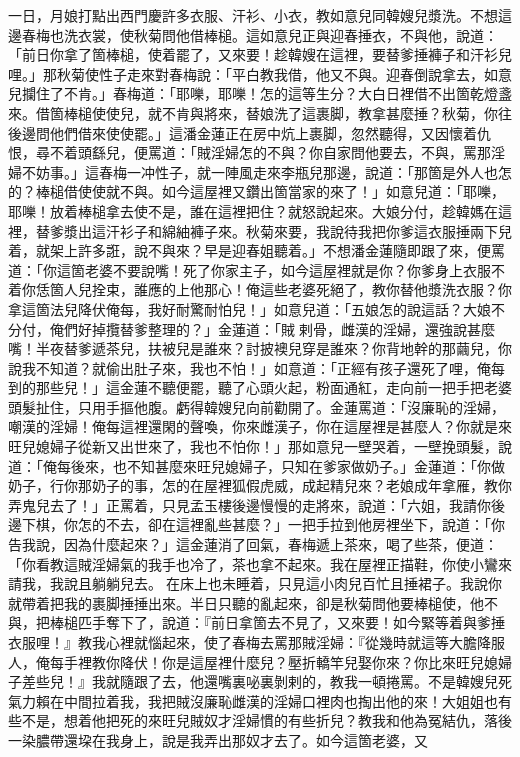一日，月娘打點出西門慶許多衣服、汗衫、小衣，教如意兒同韓嫂兒漿洗。不想這邊春梅也洗衣裳，使秋菊問他借棒槌。這如意兒正與迎春捶衣，不與他，說道：「前日你拿了箇棒槌，使着罷了，又來要！{}趁韓嫂在這裡，要替爹捶褲子和汗衫兒哩。」那秋菊使性子走來對春梅說：「平白教我借，他又不與。迎春倒說拿去，如意兒攔住了不肯。」春梅道：「耶嚛，耶嚛！怎的這等生分？大白日裡借不出箇乾燈盞來。借箇棒槌使使兒，就不肯與將來，替娘洗了這裹脚，教拿甚麼捶？秋菊，你往後邊問他們借來使使罷。」這潘金蓮正在房中炕上裹脚，忽然聽得，又因懷着仇恨，尋不着頭繇兒，便罵道：「賊淫婦怎的不與？你自家問他要去，不與，罵那淫婦不妨事。」這春梅一冲性子，就一陣風走來李瓶兒那邊，說道：「那箇是外人也怎的？棒槌借使使就不與。如今這屋裡又鑽出箇當家的來了！」{}如意兒道：「耶嚛，耶嚛！放着棒槌拿去使不是，誰在這裡把住？就怒說起來。大娘分付，趁韓媽在這裡，替爹漿出這汗衫子和綿紬褲子來。秋菊來要，我說待我把你爹這衣服捶兩下兒着，就架上許多誑，說不與來？早是迎春姐聽着。」{}不想潘金蓮隨即跟了來，便罵道：「你這箇老婆不要說嘴！死了你家主子，如今這屋裡就是你？你爹身上衣服不着你恁箇人兒拴束，誰應的上他那心！俺這些老婆死絕了，教你替他漿洗衣服？你拿這箇法兒降伏俺每，我好耐驚耐怕兒！」如意兒道：「五娘怎的說這話？大娘不分付，俺們好掉攬替爹整理的？」金蓮道：「賊𢱉剌骨，雌漢的淫婦，還強說甚麼嘴！半夜替爹遞茶兒，扶被兒是誰來？{}討披襖兒穿是誰來？你背地幹的那繭兒，你說我不知道？就偷出肚子來，我也不怕！」{}如意道：「正經有孩子還死了哩，俺每到的那些兒！」{}這金蓮不聽便罷，聽了心頭火起，粉面通紅，走向前一把手把老婆頭髮扯住，只用手摳他腹。{}虧得韓嫂兒向前勸開了。金蓮罵道：「沒廉恥的淫婦，嘲漢的淫婦！俺每這裡還閑的聲喚，你來雌漢子，你在這屋裡是甚麼人？你就是來旺兒媳婦子從新又出世來了，{}我也不怕你！」那如意兒一壁哭着，一壁挽頭髮，{}說道：「俺每後來，也不知甚麼來旺兒媳婦子，只知在爹家做奶子。」金蓮道：「你做奶子，行你那奶子的事，怎的在屋裡狐假虎威，成起精兒來？老娘成年拿雁，教你弄鬼兒去了！」正罵着，只見孟玉樓後邊慢慢的走將來，說道：「六姐，我請你後邊下棋，你怎的不去，卻在這裡亂些甚麼？」一把手拉到他房裡坐下，說道：「你告我說，因為什麼起來？」這金蓮消了回氣，春梅遞上茶來，喝了些茶，便道：「你看教這賊淫婦氣的我手也冷了，茶也拿不起來。我在屋裡正描鞋，你使小鸞來請我，我說且躺躺兒去。𢱉在床上也未睡着，只見這小肉兒百忙且捶裙子。我說你就帶着把我的裹脚捶捶出來。半日只聽的亂起來，卻是秋菊問他要棒槌使，他不與，把棒槌匹手奪下了，{}說道：『前日拿箇去不見了，又來要！如今緊等着與爹捶衣服哩！』教我心裡就惱起來，使了春梅去罵那賊淫婦：『從幾時就這等大膽降服人，俺每手裡教你降伏！你是這屋裡什麼兒？壓折轎竿兒娶你來？你比來旺兒媳婦子差些兒！』我就隨跟了去，他還嘴裏咇裏剝剌的，教我一頓捲罵。{}不是韓嫂兒死氣力賴在中間拉着我，我把賊沒廉恥雌漢的淫婦口裡肉也掏出他的來！大姐姐也有些不是，想着他把死的來旺兒賊奴才淫婦慣的有些折兒？教我和他為冤結仇，落後一染膿帶還垜在我身上，說是我弄出那奴才去了。如今這箇老婆，又